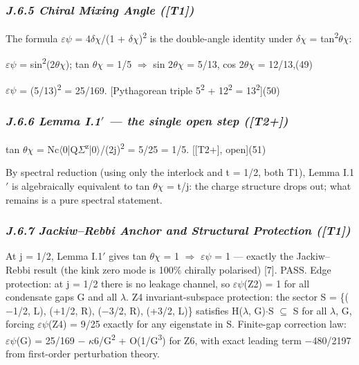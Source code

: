 \documentclass[11pt,letterpaper]{article}
\begin{document}
\subsubsection*{\itshape J.6.5  Chiral Mixing Angle ([T1])}

\noindent The formula $\varepsilon$$\psi$ = 4$\delta$$\chi$/(1 + $\delta$$\chi$)\textsuperscript{2} is the double-angle identity under $\delta$$\chi$ = tan\textsuperscript{2}$\theta$$\chi$:

\begingroup\centering $\varepsilon$$\psi$ = sin\textsuperscript{2}(2$\theta$$\chi$);   tan $\theta$$\chi$ = 1/5  $\Rightarrow$  sin 2$\theta$$\chi$ = 5/13, cos 2$\theta$$\chi$ = 12/13,\hspace{2em}(49)\par\endgroup

\begingroup\centering $\varepsilon$$\psi$ = (5/13)\textsuperscript{2} = 25/169.   [Pythagorean triple 5\textsuperscript{2} + 12\textsuperscript{2} = 13\textsuperscript{2}]\hspace{2em}(50)\par\endgroup

\subsubsection*{\itshape J.6.6  Lemma I.1$'$ --- the single open step ([T2+])}

\begingroup\centering tan $\theta$$\chi$ = Nc$\langle$0|Q$\Sigma$\textsuperscript{z}|0$\rangle$/(2j)\textsuperscript{2} = 5/25 = 1/5.   [[T2+], open]\hspace{2em}(51)\par\endgroup

\noindent By spectral reduction (using only the interlock and t = 1/2, both T1), Lemma I.1$'$ is algebraically equivalent to tan $\theta$$\chi$ = t/j: the charge structure drops out; what remains is a pure spectral statement.

\subsubsection*{\itshape J.6.7  Jackiw--Rebbi Anchor and Structural Protection ([T1])}

\noindent At j = 1/2, Lemma I.1$'$ gives tan $\theta$$\chi$ = 1 $\Rightarrow$ $\varepsilon$$\psi$ = 1 --- exactly the Jackiw--Rebbi result (the kink zero mode is 100\% chirally polarised) [7]. PASS. Edge protection: at j = 1/2 there is no leakage channel, so $\varepsilon$$\psi$(Z2) = 1 for all condensate gaps G and all $\lambda$. Z4 invariant-subspace protection: the sector S = \{($-$1/2, L), (+1/2, R), ($-$3/2, R), (+3/2, L)\} satisfies H($\lambda$, G)$\cdot$S $\subseteq$ S for all $\lambda$, G, forcing $\varepsilon$$\psi$(Z4) = 9/25 exactly for any eigenstate in S. Finite-gap correction law: $\varepsilon$$\psi$(G) = 25/169 $-$ $\kappa$6/G\textsuperscript{2} + O(1/G\textsuperscript{3}) for Z6, with exact leading term $-$480/2197 from first-order perturbation theory.
\end{document}
